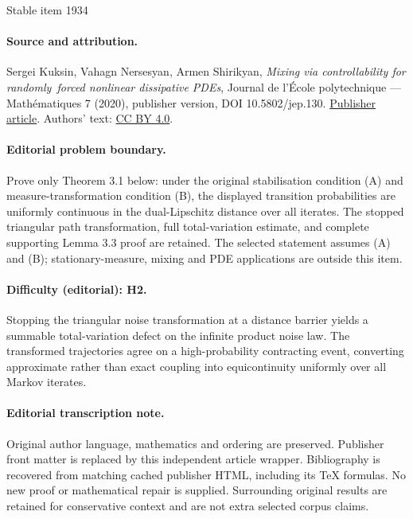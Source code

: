 \documentclass[11pt]{article}
\theoremstyle{plain}
\theoremstyle{definition}
\theoremstyle{plain}
\numberwithin{equation}{section}
\begin{document}
\begin{center}{\Large Stable item 1934}\end{center}
\paragraph{Source and attribution.}
Sergei Kuksin, Vahagn Nersesyan, Armen Shirikyan, \emph{Mixing via controllability for randomly forced nonlinear dissipative PDEs}, Journal de l’École polytechnique — Mathématiques 7 (2020), publisher version, DOI 10.5802/jep.130. \href{https://jep.centre-mersenne.org/articles/10.5802/jep.130/}{Publisher article}. Authors' text: \href{https://creativecommons.org/licenses/by/4.0/}{CC BY 4.0}.
\paragraph{Editorial problem boundary.}
Prove only Theorem 3.1 below: under the original stabilisation condition (A) and measure-transformation condition (B), the displayed transition probabilities are uniformly continuous in the dual-Lipschitz distance over all iterates. The stopped triangular path transformation, full total-variation estimate, and complete supporting Lemma 3.3 proof are retained. The selected statement assumes (A) and (B); stationary-measure, mixing and PDE applications are outside this item.
\paragraph{Difficulty (editorial): H2.}
Stopping the triangular noise transformation at a distance barrier yields a summable total-variation defect on the infinite product noise law. The transformed trajectories agree on a high-probability contracting event, converting approximate rather than exact coupling into equicontinuity uniformly over all Markov iterates.
\paragraph{Editorial transcription note.}
Original author language, mathematics and ordering are preserved. Publisher front matter is replaced by this independent article wrapper. Bibliography is recovered from matching cached publisher HTML, including its TeX formulas. No new proof or mathematical repair is supplied. Surrounding original results are retained for conservative context and are not extra selected corpus claims.
\clearpage

\setcounter{section}{-1}
\end{document}
